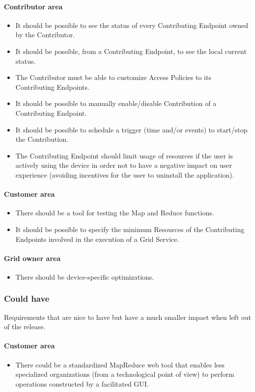 \paragraph{Contributor area}
\begin{itemize}
    \item It should be possible to see the status of every Contributing Endpoint owned by the Contributor.
    \item It should be possible, from a Contributing Endpoint, to see the local current status.
    \item The Contributor must be able to customize Access Policies to its Contributing Endpoints.
    \item It should be possible to manually enable/disable Contribution of a Contributing Endpoint.
    \item It should be possible to schedule a trigger (time and/or events) to start/stop the Contribution.
    \item The Contributing Endpoint should limit usage of resources if the user is actively using the device in order not to have a negative impact on user experience (avoiding incentives for the user to uninstall the application).
\end{itemize}
\paragraph{Customer area}
\begin{itemize}
    \item There should be a tool for testing the Map and Reduce functions.
    \item It should be possible to specify the minimum Resources of the Contributing Endpoints involved in the execution of a Grid Service.
\end{itemize}
\paragraph{Grid owner area}
\begin{itemize}
    \item There should be device-specific optimizations.
\end{itemize}

\subsubsection{Could have}
Requirements that are nice to have but have a much smaller impact when left out of the release.
\paragraph{Customer area}
\begin{itemize}
    \item There could be a standardized MapReduce web tool that enables less specialized organizations (from a technological point of view) to perform operations constructed by a facilitated GUI.
\end{itemize}

